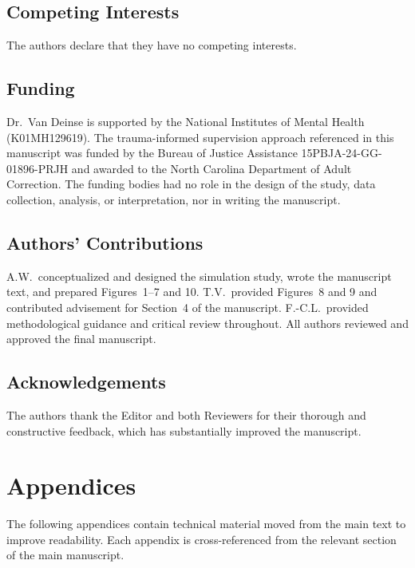 \documentclass{article}[11pt]
\begin{document}
\subsection*{Competing Interests}
The authors declare that they have no competing interests.

\subsection*{Funding}
Dr.\ Van Deinse is supported by the National Institutes of Mental Health (K01MH129619). The trauma-informed supervision approach referenced in this manuscript was funded by the Bureau of Justice Assistance 15PBJA-24-GG-01896-PRJH and awarded to the North Carolina Department of Adult Correction. The funding bodies had no role in the design of the study, data collection, analysis, or interpretation, nor in writing the manuscript.

\subsection*{Authors' Contributions}
A.W.\ conceptualized and designed the simulation study, wrote the manuscript text, and prepared Figures~1--7 and 10. T.V.\ provided Figures~8 and 9 and contributed advisement for Section~4 of the manuscript. F.-C.L.\ provided methodological guidance and critical review throughout. All authors reviewed and approved the final manuscript.

\subsection*{Acknowledgements}
The authors thank the Editor and both Reviewers for their thorough and constructive feedback, which has substantially improved the manuscript.





\clearpage
\appendix
\renewcommand{\thesection}{\Alph{section}}

\section*{Appendices}
\vspace{0.5em}
\noindent The following appendices contain technical material moved from the main text to improve readability. Each appendix is cross-referenced from the relevant section of the main manuscript.
\vspace{1em}
\end{document}
